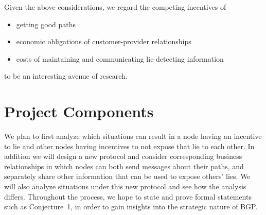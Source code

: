 \documentclass[12pt]{article}
\begin{document}
  Given the above considerations, we regard the competing incentives of
  \begin{itemize}
    \item getting good paths
    \item economic obligations of customer-provider relationships
    \item costs of maintaining and communicating lie-detecting information
  \end{itemize}
  to be an interesting avenue of research.

\section{Project Components}
  We plan to first analyze which situations can result in a node having an
  incentive to lie and other nodes having incentives to not expose that lie to
  each other. In addition we will design a new protocol and consider
  corresponding business relationships in which nodes can both send messages
  about their paths, and separately share other information that can be used to
  expose others' lies. We will also analyze situations under this new protocol
  and see how the analysis differs.
  Throughout the process, we hope to state and prove formal statements
  such as Conjecture~1, in order to gain insights into the strategic
  nature of BGP.



{}

\end{document}
